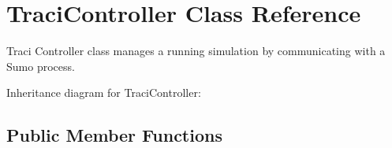 \hypertarget{class_traci_controller}{}\section{Traci\+Controller Class Reference}
\label{class_traci_controller}


Traci Controller class manages a running simulation by communicating with a Sumo process.  


Inheritance diagram for Traci\+Controller\+:\begin{figure}[H]
\begin{center}
\leavevmode
\end{center}
\end{figure}
\subsection*{Public Member Functions}
